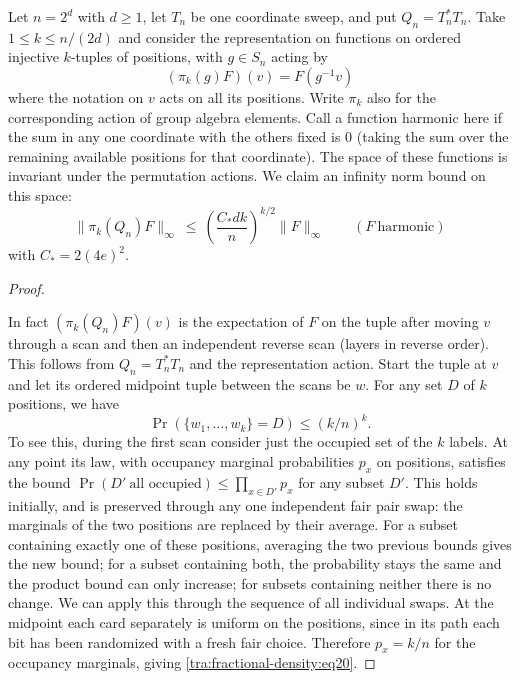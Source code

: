 \begin{proposition}\label{tra:fractional-density:harmonic}\label{e:harmonic-smoothing}

\label{tra:fractional-density:harmonic-infinity-statement}
Let $n=2^d$ with $d\ge1$, let $T_n$ be one coordinate sweep, and put $Q_n=T_n^*T_n$. Take \(1\le k\le n/(2d)\) and consider the representation on functions on ordered injective \(k\)-tuples of positions, with \(g\in S_n\) acting by
\[
 (\pi_k(g)F)(v)=F(g^{-1}v)
\]
where the notation on \(v\) acts on all its positions. Write \(\pi_k\) also for the corresponding action of group algebra elements. Call a function harmonic here if the sum in any one coordinate with the others fixed is 0 (taking the sum over the remaining available positions for that coordinate). The space of these functions is invariant under the permutation actions. We claim an infinity norm bound on this space:
\begin{equation}
 \|\pi_k(Q_n) F\|_\infty
 \ \le\ \left(\frac{C_* d k}{n}\right)^{k/2}\|F\|_\infty
 \qquad(F\ \text{harmonic})
 \label{tra:fractional-density:eq19}
\end{equation}
with $C_*=2(4e)^2$.

\end{proposition}\begin{proof}\label{tra:fractional-density:harmonic-proof}

\label{tra:fractional-density:midpoint-occupation-and-signed-path-laws}
In fact \((\pi_k(Q_n)F)(v)\) is the expectation of \(F\) on the tuple after moving \(v\) through a scan and then an independent reverse scan (layers in reverse order). This follows from \(Q_n=T_n^*T_n\) and the representation action. Start the tuple at \(v\) and let its ordered midpoint tuple between the scans be \(w\). For any set \(D\) of \(k\) positions, we have
\begin{equation}
 \Pr(\{w_1,\ldots,w_k\}=D)\le (k/n)^k .
 \label{tra:fractional-density:eq20}
\end{equation}
To see this, during the first scan consider just the occupied set of the \(k\) labels. At any point its law, with occupancy marginal probabilities \(p_x\) on positions, satisfies the bound \(\Pr(D'\ \text{all occupied})\le\prod_{x\in D'}p_x\) for any subset \(D'\). This holds initially, and is preserved through any one independent fair pair swap: the marginals of the two positions are replaced by their average. For a subset containing exactly one of these positions, averaging the two previous bounds gives the new bound; for a subset containing both, the probability stays the same and the product bound can only increase; for subsets containing neither there is no change. We can apply this through the sequence of all individual swaps. At the midpoint each card separately is uniform on the positions, since in its path each bit has been randomized with a fresh fair choice. Therefore \(p_x=k/n\) for the occupancy marginals, giving \eqref{tra:fractional-density:eq20}.


\end{proof}
